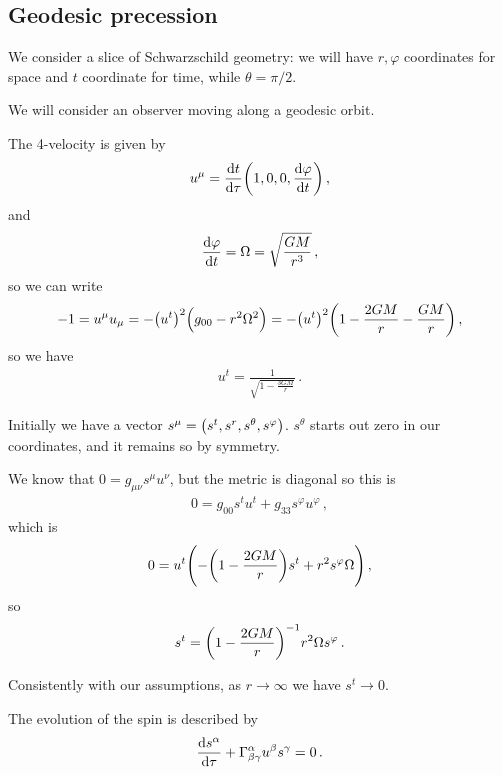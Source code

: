 \documentclass[main.tex]{subfiles}
\begin{document}
\subsection{Geodesic precession}

We consider a slice of Schwarzschild geometry: we will have \(r , \varphi \) coordinates for space and \(t\) coordinate for time, while \(\theta = \pi / 2\). 

We will consider an observer moving along a geodesic orbit. 

The 4-velocity is given by 
%
\begin{align}
  u^{\mu } = \dv{t}{\tau } \qty(1, 0, 0, \dv{\varphi }{t})
\,,
\end{align}
%
and 
%
\begin{align}
  \dv{\varphi }{t} = \Omega = \sqrt{\frac{GM}{r^3}}
\,,
\end{align}
%
so we can write 
%
\begin{align}
-1 = u^{\mu } u_{\mu }  =  - \qty(u^{t})^2 \qty(g_{00} - r^2\Omega^2) 
 = - \qty(u^{t})^2 \qty(1 - \frac{2GM}{r} - \frac{GM}{r})
\,,
\end{align}
%
so we have 
%
\begin{align}
  u^{t} = \frac{1}{\sqrt{1 - \frac{3GM}{r}}}
\,.
\end{align}
%

Initially we have a vector \(s^{\mu } = \qty(s^{t}, s^{r }, s^{\theta }, s^{\varphi })\). \(s^{\theta }\) starts out zero in our coordinates, and it remains so by symmetry. 

We know that \(0= g_{\mu \nu } s^{\mu } u^{\nu }\), but the metric is diagonal so this is 
%
\begin{align}
  0= g_{00} s^{t} u^{t} + g_{33 } s^{\varphi } u^{\varphi }
\,,
\end{align}
%
which is 
%
\begin{align}
  0= u^{t} \qty(-\qty(1 - \frac{2GM}{r} ) s^{t} + r^2 s^{\varphi } \Omega )
\,,
\end{align}
%
so 
%
\begin{align}
  s^{t} = \qty(1 - \frac{2GM}{r})^{-1} r^2 \Omega s^{\varphi }
\,.
\end{align}

Consistently with our assumptions, as \(r \rightarrow \infty \) we have \(s^{t} \rightarrow 0\). 

The evolution of the spin is described by 
%
\begin{align}
  \dv{s^{\alpha }}{\tau } + \Gamma^{\alpha }_{\beta \gamma } u^{\beta } s^{\gamma } =0 
\,.
\end{align}
\end{document}
